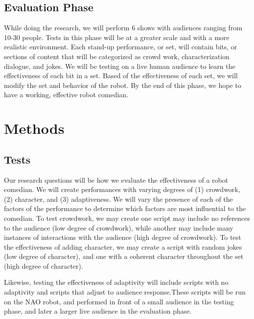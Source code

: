 \documentclass[onecolumn, draftclsnofoot,10pt, compsoc]{IEEEtran}
\begin{document}
\subsection{Evaluation Phase}
While doing the research, we will perform 6 shows with audiences ranging from 10-30 people. Tests in this phase will be at a greater scale and with a more realistic environment. Each stand-up performance, or set, will contain bits, or sections of content that will be categorized as crowd work, characterization dialogue, and jokes. We will be testing on a live human audience to learn the effectiveness of each bit in a set. Based of the effectiveness of each set, we will modify the set and behavior of the robot. By the end of this phase, we hope to have a working, effective robot comedian.

\section{Methods}

\subsection{Tests}

Our research questions will be how we evaluate the effectiveness of a robot comedian.
We will create performances with varying degrees of (1) crowdwork, (2) character, and (3) adaptiveness. We will vary the presence of each of the factors of the performance to determine which factors are most influential to the comedian.
To test crowdwork, we may create one script may include no references to the audience (low degree of crowdwork), while another may include many instances of interactions with the audience (high degree of crowdwork).
To test the effectiveness of adding character, we may create a script with random jokes (low degree of character), and one with a coherent character throughout the set (high degree of character).


Likewise, testing the effectiveness of adaptivity will include scripts with no adaptivity and scripts that adjust to audience response.These scripts will be run on the NAO robot, and performed in front of a small audience in the testing phase, and later a larger live audience in the evaluation phase.
\end{document}
